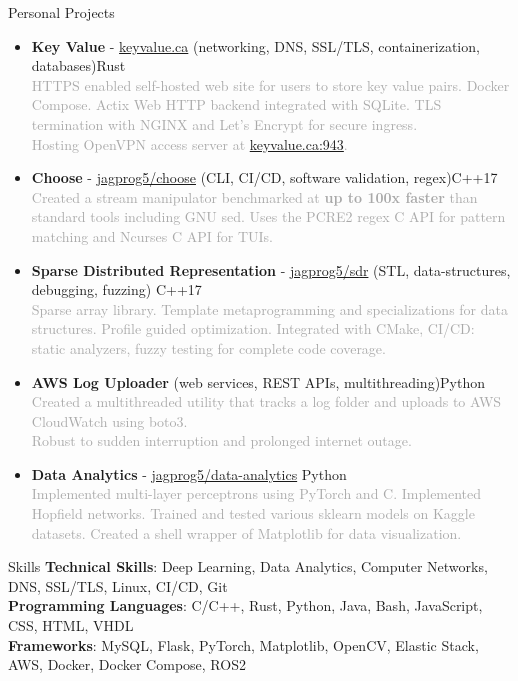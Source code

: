 \documentclass{resume} %
\begin{document}
\begin{rSection}{Personal Projects}
    \begin{itemize}
        \setlength\itemsep{-0.2em}
        \item {\bf Key Value} - \href{http://www.keyvalue.ca/}{keyvalue.ca} (networking, DNS, SSL/TLS, containerization, databases)\hfill Rust\\
        \textcolor{darkgray}{HTTPS enabled self-hosted web site for users to store key value pairs. Docker Compose. Actix Web HTTP backend integrated with SQLite. TLS termination with NGINX and Let's Encrypt for secure ingress.\\
        Hosting OpenVPN access server at \href{keyvalue.ca:943}{keyvalue.ca:943}.}
        \item {\bf Choose} - \href{https://github.com/jagprog5/choose/}{jagprog5/choose} (CLI, CI/CD, software validation, regex)\hfill C++17\\
        \textcolor{darkgray}{Created a stream manipulator benchmarked at \textbf{up to 100x faster} than standard tools including GNU sed.
        Uses the PCRE2 regex C API for pattern matching and Ncurses C API for TUIs.}
        \item {\bf Sparse Distributed Representation} - \href{https://github.com/jagprog5/SDR/}{jagprog5/sdr} (STL, data-structures, debugging, fuzzing) \hfill C++17\\
        \textcolor{darkgray}{Sparse array library. Template metaprogramming and specializations for data structures. Profile guided optimization. Integrated with CMake, CI/CD: static analyzers, fuzzy testing for complete code coverage.}
        \item {\bf AWS Log Uploader} (web services, REST APIs, multithreading)\hfill Python\\
        \textcolor{darkgray}{Created a multithreaded utility that tracks a log folder and uploads to AWS CloudWatch using boto3.\\
        Robust to sudden interruption and prolonged internet outage.}
        \item {\bf Data Analytics} - \href{https://github.com/jagprog5/resume/blob/main/data-analytics-projects.md}{jagprog5/data-analytics} \hfill Python\\
        \textcolor{darkgray}{Implemented multi-layer perceptrons using PyTorch and C. Implemented Hopfield networks. Trained and tested various sklearn models on Kaggle datasets. Created a shell wrapper of Matplotlib for data visualization.}
    \end{itemize}
\end{rSection}

\begin{rSection}{Skills}
    {\bf Technical Skills}: Deep Learning, Data Analytics, Computer Networks, DNS, SSL/TLS, Linux, CI/CD, Git\\
    {\bf Programming Languages}: C/C++, Rust, Python, Java, Bash, JavaScript, CSS, HTML, VHDL\\
    {\bf Frameworks}: MySQL, Flask, PyTorch, Matplotlib, OpenCV, Elastic Stack, AWS, Docker, Docker Compose, ROS2\\
\end{rSection}
\end{document}
